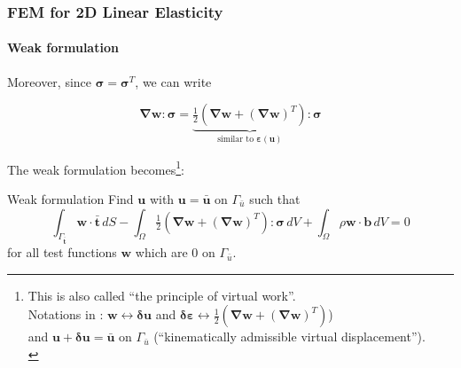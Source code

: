 \documentclass[10pt,xcolor=pdftex,dvipsnames,table]{beamer}
\begin{document}
\begin{frame}
	\frametitle{ FEM for 2D Linear Elasticity }
	\framesubtitle{ Weak formulation }
	
	Moreover, since $\boldsymbol{\sigma} = \boldsymbol{\sigma}^T$, we can write
	
	\begin{equation*}
		\boldsymbol{\nabla}\boldsymbol{w} : \boldsymbol{\sigma} = \underbrace{\tfrac{1}{2} \left( \boldsymbol{\nabla}\boldsymbol{w} + (\boldsymbol{\nabla}\boldsymbol{w})^T \right)}_{\text{similar to } \boldsymbol{\varepsilon}(\boldsymbol{u})} : \boldsymbol{\sigma}
	\end{equation*}	
	
	
	
	The weak formulation becomes\footnote{This is also called ``the principle of virtual work''. \\
		Notations in \cite{ponthot2020}: $\boldsymbol{w} \leftrightarrow \boldsymbol{\delta u}$ and $\boldsymbol{\delta \varepsilon} \leftrightarrow \tfrac{1}{2} \left( \boldsymbol{\nabla}\boldsymbol{w} + (\boldsymbol{\nabla}\boldsymbol{w})^T \right)$) \\
		and $\boldsymbol{u}+\boldsymbol{\delta u}=\boldsymbol{\bar{u}}$ on $\Gamma_{\bar{u}}$ (``kinematically admissible virtual displacement'').\\}:
	
	\begin{block}{Weak formulation}
		Find $\boldsymbol{u}$ with $\boldsymbol{u} = \bar{\boldsymbol{u}}$ on $\Gamma_{\bar{u}}$   such that
		\begin{equation*}
			\int_{\Gamma_{\bar{\boldsymbol{t}}}} \boldsymbol{w}\cdot \boldsymbol{\bar{t}}\, dS
			- \int_{\Omega} \tfrac{1}{2} \left( \boldsymbol{\nabla}\boldsymbol{w} + (\boldsymbol{\nabla}\boldsymbol{w})^T \right) : \boldsymbol{\sigma}\, dV		
			+ \int_{\Omega} \rho\boldsymbol{w} \cdot \boldsymbol{b}\, dV = 0
		\end{equation*}	
		for all test functions $\boldsymbol{w}$ which are 0 on $\Gamma_{\bar{u}}$.
	\end{block}
	
\end{frame}
\end{document}
